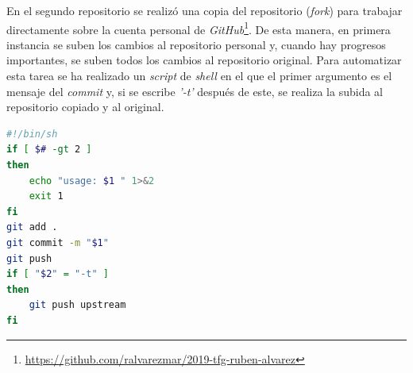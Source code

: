En el segundo repositorio se realizó una copia del repositorio (\textit{fork}) para trabajar directamente sobre la cuenta personal de \textit{GitHub}\footnote{\url{https://github.com/ralvarezmar/2019-tfg-ruben-alvarez}}. De esta manera, en primera instancia se suben los cambios al repositorio personal y, cuando hay progresos importantes, se suben todos los cambios al repositorio original. Para automatizar esta tarea se ha realizado un \textit{script} de \textit{shell} en el que el primer argumento es el mensaje del \textit{commit} y, si se escribe \textit{'-t'} después de este, se realiza la subida al repositorio copiado y al original.

\begin{lstlisting}[language=bash, caption=\textit{Script} para subir código a \textit{GitHub}]
#!/bin/sh
if [ $# -gt 2 ]
then
	echo "usage: $1 " 1>&2
	exit 1
fi
git add .
git commit -m "$1"
git push
if [ "$2" = "-t" ]
then
	git push upstream
fi
\end{lstlisting}